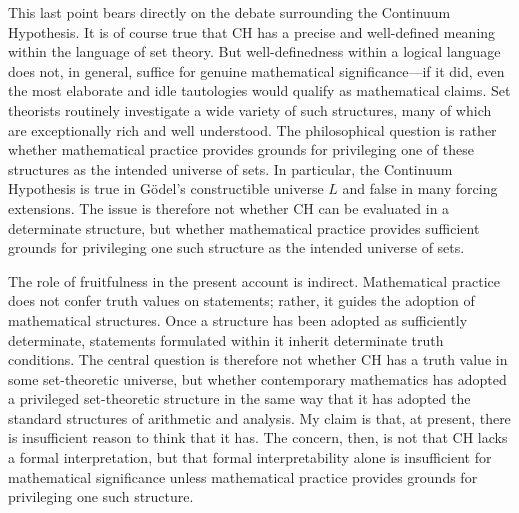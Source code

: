\documentclass[11pt,a4paper]{book}
\theoremstyle{plain}
\begin{document}
This last point bears directly on the debate surrounding the Continuum Hypothesis. It is of course true that $\mathrm{CH}$ has a precise and well-defined meaning within the language of set theory. But well-definedness within a logical language does not, in general, suffice for genuine mathematical significance---if it did, even the most elaborate and idle tautologies would qualify as mathematical claims. Set theorists routinely investigate a wide variety of such structures, many of which are exceptionally rich and well understood. The philosophical question is rather whether mathematical practice provides grounds for privileging one of these structures as the intended universe of sets. In particular, the Continuum Hypothesis is true in Gödel's constructible universe $L$ and false in many forcing extensions. The issue is therefore not whether $\mathrm{CH}$ can be evaluated in a determinate structure, but whether mathematical practice provides sufficient grounds for privileging one such structure as the intended universe of sets.

The role of fruitfulness in the present account is indirect. Mathematical practice does not confer truth values on statements; rather, it guides the adoption of mathematical structures. Once a structure has been adopted as sufficiently determinate, statements formulated within it inherit determinate truth conditions. The central question is therefore not whether $\mathrm{CH}$ has a truth value in some set-theoretic universe, but whether contemporary mathematics has adopted a privileged set-theoretic structure in the same way that it has adopted the standard structures of arithmetic and analysis. My claim is that, at present, there is insufficient reason to think that it has. The concern, then, is not that $\mathrm{CH}$ lacks a formal interpretation, but that formal interpretability alone is insufficient for mathematical significance unless mathematical practice provides grounds for privileging one such structure.
\end{document}

